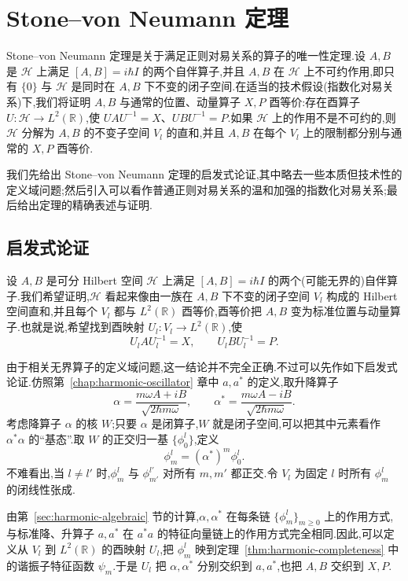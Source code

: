\chapter{Stone--von Neumann 定理}
\label{chap:stone-von-neumann}

Stone--von Neumann 定理是关于满足正则对易关系的算子的唯一性定理.设 $A,B$ 是 $\mathcal H$ 上满足 $[A,B]=i\hbar I$ 的两个自伴算子,并且 $A,B$ 在 $\mathcal H$ 上不可约作用,即只有 $\{0\}$ 与 $\mathcal H$ 是同时在 $A,B$ 下不变的闭子空间.在适当的技术假设(指数化对易关系)下,我们将证明 $A,B$ 与通常的位置、动量算子 $X,P$ 酉等价:存在酉算子 $U:\mathcal H\to L^2(\mathbb R)$,使 $UAU^{-1}=X$、$UBU^{-1}=P$.如果 $\mathcal H$ 上的作用不是不可约的,则 $\mathcal H$ 分解为 $A,B$ 的不变子空间 $V_l$ 的直和,并且 $A,B$ 在每个 $V_l$ 上的限制都分别与通常的 $X,P$ 酉等价.

我们先给出 Stone--von Neumann 定理的启发式论证,其中略去一些本质但技术性的定义域问题;然后引入可以看作普通正则对易关系的温和加强的指数化对易关系;最后给出定理的精确表述与证明.

\section{启发式论证}
\label{sec:stone-heuristic}

设 $A,B$ 是可分 Hilbert 空间 $\mathcal H$ 上满足 $[A,B]=i\hbar I$ 的两个(可能无界的)自伴算子.我们希望证明,$\mathcal H$ 看起来像由一族在 $A,B$ 下不变的闭子空间 $V_l$ 构成的 Hilbert 空间直和,并且每个 $V_l$ 都与 $L^2(\mathbb R)$ 酉等价,酉等价把 $A,B$ 变为标准位置与动量算子.也就是说,希望找到酉映射 $U_l:V_l\to L^2(\mathbb R)$,使
\[
U_lAU_l^{-1}=X,
\qquad U_lBU_l^{-1}=P.
\]

由于相关无界算子的定义域问题,这一结论并不完全正确.不过可以先作如下启发式论证.仿照第~\ref{chap:harmonic-oscillator} 章中 $a,a^*$ 的定义,取升降算子
\[
\alpha=\frac{m\omega A+iB}{\sqrt{2\hbar m\omega}},
\qquad
\alpha^*=\frac{m\omega A-iB}{\sqrt{2\hbar m\omega}}.
\]
考虑降算子 $\alpha$ 的核 $W$;只要 $\alpha$ 是闭算子,$W$ 就是闭子空间,可以把其中元素看作 $\alpha^*\alpha$ 的“基态”.取 $W$ 的正交归一基 $\{\phi_0^l\}$,定义
\[
\phi_m^l=(\alpha^*)^m\phi_0^l.
\]
不难看出,当 $l\neq l'$ 时,$\phi_m^l$ 与 $\phi_{m'}^{l'}$ 对所有 $m,m'$ 都正交.令 $V_l$ 为固定 $l$ 时所有 $\phi_m^l$ 的闭线性张成.

由第~\ref{sec:harmonic-algebraic} 节的计算,$\alpha,\alpha^*$ 在每条链 $\{\phi_m^l\}_{m\geq0}$ 上的作用方式,与标准降、升算子 $a,a^*$ 在 $a^*a$ 的特征向量链上的作用方式完全相同.因此,可以定义从 $V_l$ 到 $L^2(\mathbb R)$ 的酉映射 $U_l$,把 $\phi_m^l$ 映到定理~\ref{thm:harmonic-completeness} 中的谐振子特征函数 $\psi_m$.于是 $U_l$ 把 $\alpha,\alpha^*$ 分别交织到 $a,a^*$,也把 $A,B$ 交织到 $X,P$.

